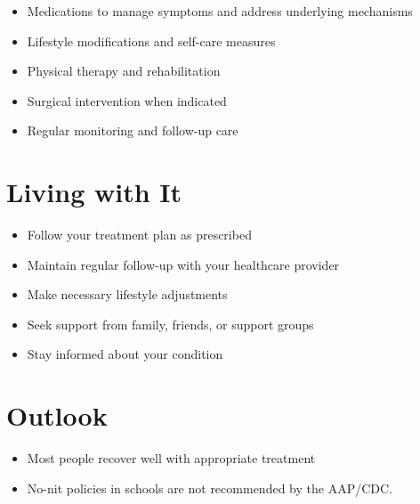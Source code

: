 \begin{itemize}[noitemsep]
  \item Medications to manage symptoms and address underlying mechanisms
  \item Lifestyle modifications and self-care measures
  \item Physical therapy and rehabilitation
  \item Surgical intervention when indicated
  \item Regular monitoring and follow-up care
\end{itemize}
\section{Living with It}
\begin{itemize}[noitemsep]
  \item Follow your treatment plan as prescribed
  \item Maintain regular follow-up with your healthcare provider
  \item Make necessary lifestyle adjustments
  \item Seek support from family, friends, or support groups
  \item Stay informed about your condition
\end{itemize}
\section{Outlook}
\begin{itemize}[noitemsep]
  \item Most people recover well with appropriate treatment
  \item No-nit policies in schools are not recommended by the AAP/CDC.
\end{itemize}
